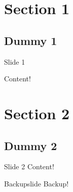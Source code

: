 

\togglefalse{logo} %
\togglefalse{totalcounter} %
\togglefalse{section-slides} %

\renewcommand{\Title}{Example Template}
\renewcommand{\SubTitle}{for \LaTeX~ Beamer}
\renewcommand{\Author}{Yannick Forster}
\renewcommand{\CoAuthor}{}
\renewcommand{\Institute}{{\scshape Saarland University}}
\date{}






\showtitlepage %

\begin{frame}
  \tableofcontents
\end{frame}

\section{Section 1}

\subsection{Dummy 1} %

\begin{frame}{Slide 1}

  Content!

\end{frame}

\section{Section 2}

\subsection{Dummy 2}

\begin{frame}{Slide 2}
  Content!
\end{frame}

\appendix %

\backupbegin %

\begin{frame}{Backupslide}
  Backup!
\end{frame}

\backupend



